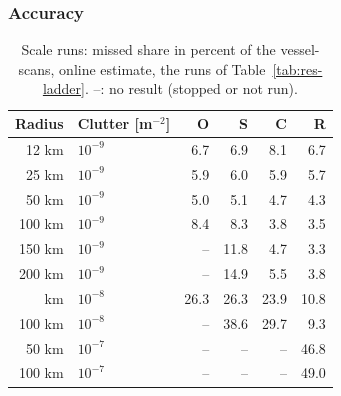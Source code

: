 \subsubsection{Accuracy}

\begin{table}[htbp]
\centering
\caption{Scale runs: missed share in percent of the vessel-scans, online estimate, the runs of Table~\ref{tab:res-ladder}. --: no result (stopped or not run).}
\label{tab:res-missed}
\small
\begin{tabular}{r l r r r r}
\toprule
Radius & Clutter [m$^{-2}$] & O & S & C & R \\
\midrule
12 km & $10^{-9}$ & 6.7 & 6.9 & 8.1 & 6.7 \\
25 km & $10^{-9}$ & 5.9 & 6.0 & 5.9 & 5.7 \\
50 km & $10^{-9}$ & 5.0 & 5.1 & 4.7 & 4.3 \\
100 km & $10^{-9}$ & 8.4 & 8.3 & 3.8 & 3.5 \\
150 km & $10^{-9}$ & -- & 11.8 & 4.7 & 3.3 \\
200 km & $10^{-9}$ & -- & 14.9 & 5.5 & 3.8 \\
\addlinespace
50 km & $10^{-8}$ & 26.3 & 26.3 & 23.9 & 10.8 \\
100 km & $10^{-8}$ & -- & 38.6 & 29.7 & 9.3 \\
50 km & $10^{-7}$ & -- & -- & -- & 46.8 \\
100 km & $10^{-7}$ & -- & -- & -- & 49.0 \\
\bottomrule
\end{tabular}
\end{table}

